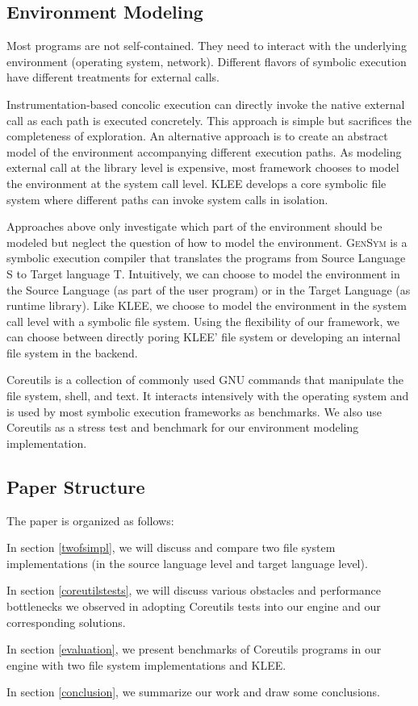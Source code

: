\documentclass[sigplan, nonacm]{acmart}\settopmatter{printfolios=true,printccs=false,printacmref=false}
\newcommand{\tool}{\textsc{GenSym}\xspace}
\begin{document}
\subsection{Environment Modeling}
Most programs are not self-contained. They need to interact with the underlying environment (operating system, network). Different flavors of symbolic execution have different treatments for external calls. \par
Instrumentation-based concolic execution can directly invoke the native external call as each path is executed concretely. This approach is simple but sacrifices the completeness of exploration. An alternative approach is to create an abstract model of the environment accompanying different execution paths. As modeling external call at the library level is expensive, most framework chooses to model the environment at the system call level.
 KLEE\cite{cadar2008klee} develops a core symbolic file system where different paths can invoke system calls in isolation. \par
Approaches above only investigate which part of the environment should be modeled but neglect the question of how to model the environment. \tool is a symbolic execution compiler that translates the programs from Source Language S to Target language T. Intuitively, we can choose to model the environment in the Source Language (as part of the user program) or in the Target Language (as runtime library). Like KLEE, we choose to model the environment in the system call level with a symbolic file system. Using the flexibility of our framework, we can choose between directly poring KLEE' file system or developing an internal file system in the backend.\par
Coreutils \cite{coreutilsweb} is a collection of commonly used GNU commands that manipulate the file system, shell, and text. It interacts intensively with the operating system and is used by most symbolic execution frameworks as benchmarks. We also use Coreutils as a stress test and benchmark for our environment modeling implementation.
\subsection{Paper Structure}
The paper is organized as follows: \par \par
In section \ref{twofsimpl}, we will discuss and compare two file system implementations (in the source language level and target language level).\par
In section \ref{coreutilstests}, we will discuss various obstacles and performance bottlenecks we observed in adopting Coreutils tests into our engine and our corresponding solutions.\par
In section \ref{evaluation}, we present benchmarks of Coreutils programs in our engine with two file system implementations and KLEE.\par
In section \ref{conclusion}, we summarize our work and draw some conclusions.
\end{document}
